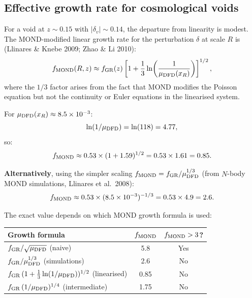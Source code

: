 \documentclass[11pt,a4paper]{article}
\newcommand{\mufd}{\mu_{\rm DFD}}
\newcommand{\ee}[1]{\times 10^{#1}}
\begin{document}
\subsection{Effective growth rate for cosmological voids}

For a void at $z \sim 0.15$ with $|\delta_v| \sim 0.14$, the
departure from linearity is modest. The MOND-modified linear growth
rate for the perturbation $\delta$ at scale $R$ is (Llinares \&
Knebe 2009; Zhao \& Li 2010):
\begin{equation}
f_{\rm MOND}(R,z) \approx f_{\rm GR}(z)\left[1 +
\frac{1}{3}\ln\!\left(\frac{1}{\mufd(x_R)}\right)\right]^{1/2},
\label{eq:f-MOND-corrected}
\end{equation}
where the $1/3$ factor arises from the fact that MOND modifies the
Poisson equation but not the continuity or Euler equations in the
linearised system.

For $\mufd(x_R) \approx 8.5\ee{-3}$:
\begin{equation}
\ln(1/\mufd) = \ln(118) = 4.77,
\end{equation}
so:
\begin{equation}
f_{\rm MOND} \approx 0.53\times(1 + 1.59)^{1/2}
= 0.53\times 1.61 = 0.85.
\label{eq:f-MOND-corrected-value}
\end{equation}

\textbf{Alternatively}, using the simpler scaling
$f_{\rm MOND} = f_{\rm GR}/\mufd^{1/3}$ (from $N$-body MOND
simulations, Llinares et al.\ 2008):
\begin{equation}
f_{\rm MOND} \approx 0.53\times (8.5\ee{-3})^{-1/3}
= 0.53\times 4.9 = 2.6.
\label{eq:f-MOND-sim}
\end{equation}

The exact value depends on which MOND growth formula is used:
\begin{center}
\begin{tabular}{lcc}
\toprule
\textbf{Growth formula} & $f_{\rm MOND}$ & $f_{\rm MOND} > 3$? \\
\midrule
$f_{\rm GR}/\sqrt{\mufd}$ (naive) & 5.8 & Yes \\
$f_{\rm GR}/\mufd^{1/3}$ (simulations) & 2.6 & No \\
$f_{\rm GR}\,(1+\frac{1}{3}\ln(1/\mufd))^{1/2}$ (linearised) & 0.85 & No \\
$f_{\rm GR}\,(1/\mufd)^{1/4}$ (intermediate) & 1.75 & No \\
\bottomrule
\end{tabular}
\end{center}
\end{document}
